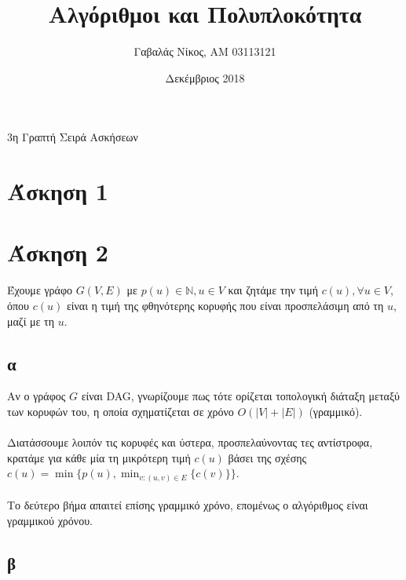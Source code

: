 \documentclass[12pt,a4paper]{article}
\title{Αλγόριθμοι και Πολυπλοκότητα}
\author{Γαβαλάς Νίκος, AM 03113121}
\date{Δεκέμβριος 2018}
\begin{document}
  \maketitle

  \begin{center}
    \Large{3η Γραπτή Σειρά Ασκήσεων}
  \end{center}

  \section{Άσκηση 1}

  \section{Άσκηση 2}

  Έχουμε γράφο \( G(V, E) \) με \( p(u) \in \mathbb{N}, u \in V \) και ζητάμε 
  την τιμή  \( c(u), \forall u \in V \), όπου \( c(u) \) είναι η τιμή της 
  φθηνότερης κορυφής που είναι προσπελάσιμη από τη \( u \), μαζί με τη \( u \).

  \subsection{α}

  Aν ο γράφος \( G \) είναι {\latintext DAG}, γνωρίζουμε πως τότε ορίζεται
  τοπολογική διάταξη μεταξύ των κορυφών του, η οποία σχηματίζεται σε χρόνο
  \( Ο(|V| + |E|) \) (γραμμικό).
  \\
  \\
  Διατάσσουμε λοιπόν τις κορυφές και ύστερα,
  προσπελαύνοντας τες αντίστροφα, κρατάμε για κάθε μία τη μικρότερη τιμή
  \( c(u) \) βάσει της σχέσης \( c(u) = \min\{ p(u), \min_{ v : (u, v) \in E}
  \{c(v)\}\} \).
  \\
  \\
  Το δεύτερο βήμα απαιτεί επίσης γραμμικό χρόνο, επομένως ο αλγόριθμος είναι
  γραμμικού χρόνου.

  \subsection{β}
\end{document}
